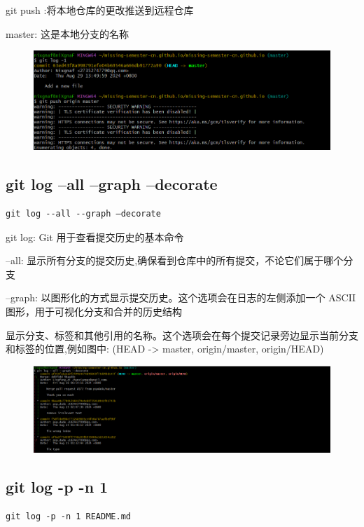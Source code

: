 \documentclass{article}
\begin{document}
\noindent git push :将本地仓库的更改推送到远程仓库

\noindent master: 这是本地分支的名称
\begin{figure}[h]
    \centering
    \includegraphics[width=1\linewidth]{picture/gitpush.png}
\end{figure}

\subsection{git log --all --graph –decorate}
\lstset{language=bash}
\begin{lstlisting}
git log --all --graph –decorate
\end{lstlisting}

\noindent git log: Git 用于查看提交历史的基本命令

\noindent --all: 显示所有分支的提交历史,确保看到仓库中的所有提交，不论它们属于哪个分支

\noindent --graph: 以图形化的方式显示提交历史。这个选项会在日志的左侧添加一个 ASCII 图形，用于可视化分支和合并的历史结构

\noindent 显示分支、标签和其他引用的名称。这个选项会在每个提交记录旁边显示当前分支和标签的位置,例如图中: (HEAD -> master, origin/master, origin/HEAD)
\begin{figure}[h]
    \centering
    \includegraphics[width=1\linewidth]{picture/getlogall.png}
\end{figure}

\subsection{git log -p -n 1}
\lstset{language=bash}
\begin{lstlisting}
git log -p -n 1 README.md
\end{lstlisting}
\end{document}
